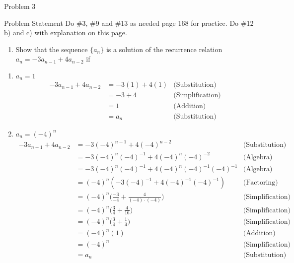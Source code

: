 \begin{problem}{Problem 3}
    \begin{statement}{Problem Statement}
        Do \#3, \#9 and \#13 as needed page 168 for practice. Do \#12 b) and c) with explanation on this page.
    \end{statement}

    \begin{Highlight}[Solution - \#12]
        \begin{enumerate}[label = \arabic*., start = 12]
            \item Show that the sequence $\{a_{n}\}$ is a solution of the recurrence relation $a_{n} = -3a_{n-1} + 4a_{n-2}$ if
        \end{enumerate}
        
        \begin{enumerate}[label = (\alph*), start = 2]
            \item $a_{n} = 1$
            \begin{align*}
                -3a_{n-1} + 4a_{n-2} & = -3(1) + 4(1) & \text{(Substitution)} \\
                & = -3 + 4 & \text{(Simplification)} \\
                & = 1 & \text{(Addition)} \\
                & = a_{n} & \text{(Substitution)}
            \end{align*}
            \item $a_{n} = (-4)^{n}$
            \begin{align*}
                -3a_{n-1} + 4a_{n-2} & = -3(-4)^{n - 1} + 4(-4)^{n - 2} & \text{(Substitution)} \\
                & = -3(-4)^{n}(-4)^{-1} + 4(-4)^{n}(-4)^{-2} & \text{(Algebra)} \\
                & = -3(-4)^{n}(-4)^{-1} + 4(-4)^{n}(-4)^{-1}(-4)^{-1} & \text{(Algebra)} \\
                & = (-4)^{n}(-3(-4)^{-1} + 4(-4)^{-1}(-4)^{-1}) & \text{(Factoring)} \\
                & = (-4)^{n}\Bigg(\frac{-3}{-4} + \frac{4}{(-4)\cdot(-4)}\Bigg) & \text{(Simplification)} \\
                & = (-4)^{n}\Bigg(\frac{3}{4} + \frac{4}{16}\Bigg) & \text{(Simplification)} \\
                & = (-4)^{n}\Bigg(\frac{3}{4} + \frac{1}{4}\Bigg) & \text{(Simplification)} \\
                & = (-4)^{n}(1) & \text{(Addition)} \\
                & = (-4)^{n} & \text{(Simplification)} \\
                & = a_{n} & \text{(Substitution)}
            \end{align*}
        \end{enumerate}


\end{Highlight}
\end{problem}
